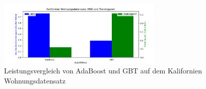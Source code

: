 \begin{figure}[ht]
    \centering
    \includegraphics[width=0.7\textwidth]{Images/housing_performance.png}
    \caption{Leistungsvergleich von AdaBoost und GBT auf dem Kalifornien Wohnungsdatensatz}
    \label{fig:housing_performance}
\end{figure}
